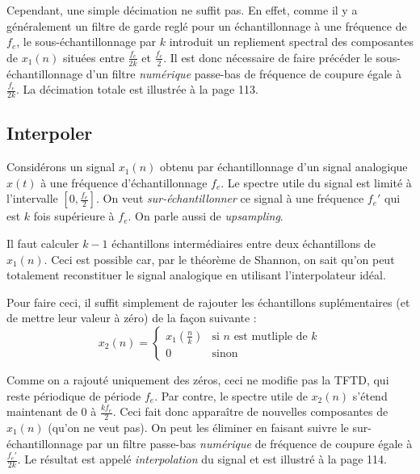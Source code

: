             Cependant, une simple décimation ne suffit pas. En effet, comme il y a généralement un filtre de garde reglé pour un échantillonnage à une fréquence de $f_e$, le sous-échantillonnage par $k$ introduit un repliement spectral des composantes de $x_1(n)$ situées entre $\frac{f_e}{2k}$ et $\frac{f_e}{2}$. Il est donc nécessaire de faire précéder le sous-échantillonnage d'un filtre \textit{numérique} passe-bas de fréquence de coupure égale à $\frac{f_e}{2k}$. La décimation totale est illustrée à la page 113.

        \subsection{Interpoler}
            Considérons un signal $x_1(n)$ obtenu par échantillonnage d'un signal analogique $x(t)$ à une fréquence d'échantillonnage $f_e$. Le spectre utile du signal est limité à l'intervalle $[0, \frac{f_e}{2}]$. On veut \textit{sur-échantillonner} ce signal à une fréquence $f_e'$ qui est $k$ fois supérieure à $f_e$. On parle aussi de \textit{upsampling}.

            Il faut calculer $k - 1$ échantillons intermédiaires entre deux échantillons de $x_1(n)$. Ceci est possible car, par le théorème de Shannon, on sait qu'on peut totalement reconstituer le signal analogique en utilisant l'interpolateur idéal.

            Pour faire ceci, il suffit simplement de rajouter les échantillons suplémentaires (et de mettre leur valeur à zéro) de la façon suivante :
            $$
                x_2(n) = \begin{cases}
                    x_1(\frac{n}{k}) &\text{si } n \text{ est mutliple de } k\\
                    0 &\text{sinon}
                \end{cases}
            $$

            Comme on a rajouté uniquement des zéros, ceci ne modifie pas la TFTD, qui reste périodique de période $f_e$. Par contre, le spectre utile de $x_2(n)$ s'étend maintenant de 0 à $\frac{kf_e}{2}$. Ceci fait donc apparaître de nouvelles composantes de $x_1(n)$ (qu'on ne veut pas). On peut les éliminer en faisant suivre le sur-échantillonnage par un filtre passe-bas \textit{numérique} de fréquence de coupure égale à $\frac{f_e'}{2k}$. Le résultat est appelé \textit{interpolation} du signal et est illustré à la page 114.

